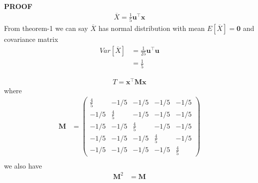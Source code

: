 \documentclass{beamer}
\renewcommand{\vec}[1]{\mathbf{#1}}
\newcommand{\myvec}[1]{\ensuremath{\begin{pmatrix}#1\end{pmatrix}}}
\providecommand{\mean}[1]{E[ #1 ]}
\providecommand{\sbrak}[1]{\ensuremath{{}\left[#1\right]}}
\begin{document}
\begin{frame}
\textbf{PROOF}\\
\begin{align}
    \overline{X}=\frac{1}{5}\vec{u}^{\top}\vec{x}\label{3.1}
\end{align}
From theorem-1 we can say $\overline{X}$ has normal distribution with mean $\mean{\overline{X}}=\vec{0}$ and covariance matrix
\begin{align}
    Var\sbrak{\overline{X}}&=\frac{1}{25}\vec{u}^{\top}\vec{u}\\
    &=\frac{1}{5}
\end{align}
\end{frame}
\begin{frame}
  \begin{align}
   T=\vec{x}^{\top}\vec{M}\vec{x}
\end{align}
where
\begin{align}
    \vec{M}&=\myvec{\frac{4}{5}&-1/5&-1/5&-1/5&-1/5\\
                   -1/5&\frac{4}{5}&-1/5&-1/5&-1/5\\
                   -1/5&-1/5&\frac{4}{5}&-1/5&-1/5\\
                   -1/5&-1/5&-1/5&\frac{4}{5}&-1/5\\
                   -1/5&-1/5&-1/5&-1/5&\frac{4}{5}}\\
\end{align}
we also have 
\begin{align}
    \vec{M}^2&=\vec{M}
\end{align}  
\end{frame}
\end{document}
